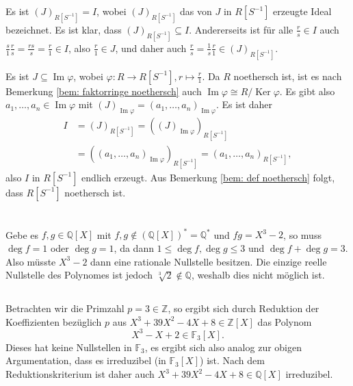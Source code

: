 \documentclass[a4paper,10pt]{article}
\theoremstyle{definition}
\newcommand{\Z}{\mathbb{Z}}
\newcommand{\Q}{\mathbb{Q}}
\newcommand{\F}{\mathbb{F}}
\newcommand{\Img}{\operatorname{Im}}
\newcommand{\Ker}{\operatorname{Ker}}
\begin{document}
Es ist $(J)_{R[S^{-1}]} = I$, wobei $(J)_{R[S^{-1}]}$ das von $J$ in $R[S^{-1}]$ erzeugte Ideal bezeichnet. Es ist klar, dass $(J)_{R[S^{-1}]} \subseteq I$. Andererseits ist für alle $\frac{r}{s} \in I$ auch $\frac{s}{1} \frac{r}{s} = \frac{rs}{s} = \frac{r}{1} \in I$, also $\frac{r}{1} \in J$, und daher auch $\frac{r}{s} = \frac{1}{s} \frac{r}{1} \in (J)_{R[S^{-1}]}$.

Es ist $J \subseteq \Img \varphi$, wobei $\varphi : R \rightarrow R[S^{-1}], r \mapsto \frac{r}{1}$. Da $R$ noethersch ist, ist es nach Bemerkung \ref{bem: faktorringe noethersch} auch $\Img \varphi \cong R / \Ker \varphi$. Es gibt also $a_1, \ldots, a_n \in \Img \varphi$ mit $(J)_{\Img \varphi} = (a_1, \ldots, a_n)_{\Img \varphi}$. Es ist daher
\begin{align*}
 I
 &= (J)_{R[S^{-1}]}
 = ((J)_{\Img \varphi})_{R[S^{-1}]} \\
 &= ((a_1, \ldots, a_n)_{\Img \varphi})_{R[S^{-1}]}
 = (a_1, \ldots, a_n)_{R[S^{-1}]},
\end{align*}
also $I$ in $R[S^{-1}]$ endlich erzeugt. Aus Bemerkung \ref{bem: def noethersch} folgt, dass $R[S^{-1}]$ noethersch ist.





\section{}





\section{}


\subsection{}
Gebe es $f,g \in \Q[X]$ mit $f,g \not\in (\Q[X])^* = \Q^*$ und $fg = X^3-2$, so muss $\deg f = 1$ oder $\deg g = 1$, da dann $1 \leq \deg f, \deg g \leq 3$ und $\deg f + \deg g = 3$. Also müsste $X^3-2$ dann eine rationale Nullstelle besitzen. Die einzige reelle Nullstelle des Polynomes ist jedoch $\sqrt[3]{2} \not\in \Q$, weshalb dies nicht möglich ist.


\subsection{}
Betrachten wir die Primzahl $p = 3 \in \Z$, so ergibt sich durch Reduktion der Koeffizienten bezüglich $p$ aus $X^3 +39X^2 -4X +8 \in \Z[X]$ das Polynom
\[
 X^3 -X +2 \in \F_3[X].
\]
Dieses hat keine Nullstellen in $\F_3$, es ergibt sich also analog zur obigen Argumentation, dass es irreduzibel (in $\F_3[X]$) ist. Nach dem Reduktionskriterium ist daher auch $X^3 +39X^2 -4X +8 \in \Q[X]$ irreduzibel.
\end{document}

